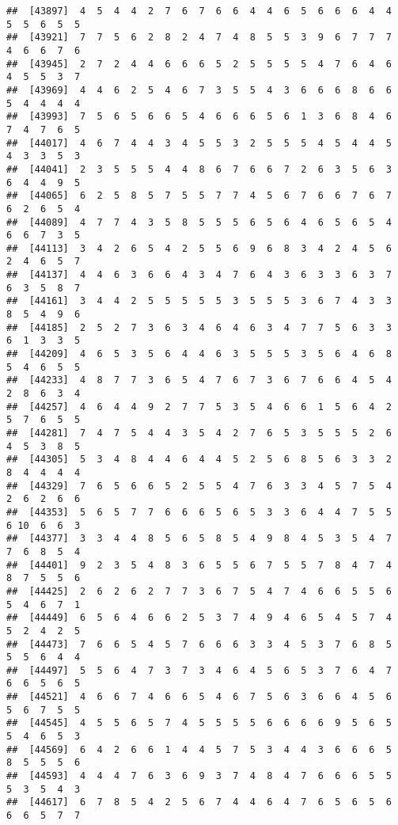 \documentclass[
]{book}
\begin{document}
\begin{verbatim}
##  [43897]  4  5  4  4  2  7  6  7  6  6  4  4  6  5  6  6  6  4  4  5  5  6  5  5
##  [43921]  7  7  5  6  2  8  2  4  7  4  8  5  5  3  9  6  7  7  7  4  6  6  7  6
##  [43945]  2  7  2  4  4  6  6  6  5  2  5  5  5  5  4  7  6  4  6  4  5  5  3  7
##  [43969]  4  4  6  2  5  4  6  7  3  5  5  4  3  6  6  6  8  6  6  5  4  4  4  4
##  [43993]  7  5  6  5  6  6  5  4  6  6  6  5  6  1  3  6  8  4  6  7  4  7  6  5
##  [44017]  4  6  7  4  4  3  4  5  5  3  2  5  5  5  4  5  4  4  5  4  3  3  5  3
##  [44041]  2  3  5  5  5  4  4  8  6  7  6  6  7  2  6  3  5  6  3  6  4  4  9  5
##  [44065]  6  2  5  8  5  7  5  5  7  7  4  5  6  7  6  6  7  6  7  6  2  6  5  4
##  [44089]  4  7  7  4  3  5  8  5  5  5  6  5  6  4  6  5  6  5  4  6  6  7  3  5
##  [44113]  3  4  2  6  5  4  2  5  5  6  9  6  8  3  4  2  4  5  6  2  4  6  5  7
##  [44137]  4  4  6  3  6  6  4  3  4  7  6  4  3  6  3  3  6  3  7  6  3  5  8  7
##  [44161]  3  4  4  2  5  5  5  5  5  3  5  5  5  3  6  7  4  3  3  8  5  4  9  6
##  [44185]  2  5  2  7  3  6  3  4  6  4  6  3  4  7  7  5  6  3  3  6  1  3  3  5
##  [44209]  4  6  5  3  5  6  4  4  6  3  5  5  5  3  5  6  4  6  8  5  4  6  5  5
##  [44233]  4  8  7  7  3  6  5  4  7  6  7  3  6  7  6  6  4  5  4  2  8  6  3  4
##  [44257]  4  6  4  4  9  2  7  7  5  3  5  4  6  6  1  5  6  4  2  5  7  6  5  5
##  [44281]  7  4  7  5  4  4  3  5  4  2  7  6  5  3  5  5  5  2  6  4  5  3  8  5
##  [44305]  5  3  4  8  4  4  6  4  4  5  2  5  6  8  5  6  3  3  2  8  4  4  4  4
##  [44329]  7  6  5  6  6  5  2  5  5  4  7  6  3  3  4  5  7  5  4  2  6  2  6  6
##  [44353]  5  6  5  7  7  6  6  6  5  6  5  3  3  6  4  4  7  5  5  6 10  6  6  3
##  [44377]  3  3  4  4  8  5  6  5  8  5  4  9  8  4  5  3  5  4  7  7  6  8  5  4
##  [44401]  9  2  3  5  4  8  3  6  5  5  6  7  5  5  7  8  4  7  4  8  7  5  5  6
##  [44425]  2  6  2  6  2  7  7  3  6  7  5  4  7  4  6  6  5  5  6  5  4  6  7  1
##  [44449]  6  5  6  4  6  6  2  5  3  7  4  9  4  6  5  4  5  7  4  5  2  4  2  5
##  [44473]  7  6  6  5  4  5  7  6  6  6  3  3  4  5  3  7  6  8  5  5  5  6  4  4
##  [44497]  5  5  6  4  7  3  7  3  4  6  4  5  6  5  3  7  6  4  7  6  6  5  6  5
##  [44521]  4  6  6  7  4  6  6  5  4  6  7  5  6  3  6  6  4  5  6  5  6  7  5  5
##  [44545]  4  5  5  6  5  7  4  5  5  5  5  6  6  6  6  9  5  6  5  5  4  6  5  3
##  [44569]  6  4  2  6  6  1  4  4  5  7  5  3  4  4  3  6  6  6  5  8  5  5  5  6
##  [44593]  4  4  4  7  6  3  6  9  3  7  4  8  4  7  6  6  6  5  5  5  3  5  4  3
##  [44617]  6  7  8  5  4  2  5  6  7  4  4  6  4  7  6  5  6  5  6  6  6  5  7  7

\end{verbatim}
\end{document}
